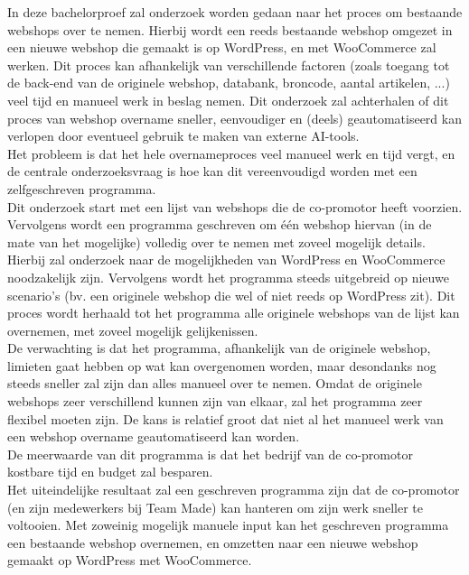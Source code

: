 \documentclass[dutch,dit,thesis]{hogentreport}
\begin{document}
In deze bachelorproef zal onderzoek worden gedaan naar het proces om bestaande webshops over te nemen. Hierbij wordt een reeds bestaande webshop omgezet in een nieuwe webshop die gemaakt is op WordPress, en met WooCommerce zal werken.
Dit proces kan afhankelijk van verschillende factoren (zoals toegang tot de back-end van de originele webshop, databank, broncode, aantal artikelen, ...) veel tijd en manueel werk in beslag nemen. Dit onderzoek zal achterhalen of dit proces van webshop overname sneller, eenvoudiger en (deels) geautomatiseerd kan verlopen door eventueel gebruik te maken van externe AI-tools.
\\
Het probleem is dat het hele overnameproces veel manueel werk en tijd vergt, en de centrale onderzoeksvraag is hoe kan dit vereenvoudigd worden met een zelfgeschreven programma.
\\ 
Dit onderzoek start met een lijst van webshops die de co-promotor heeft voorzien. 
Vervolgens wordt een programma geschreven om één webshop hiervan (in de mate van het mogelijke) volledig over te nemen met zoveel mogelijk details. Hierbij zal onderzoek naar de mogelijkheden van WordPress en WooCommerce noodzakelijk zijn.
Vervolgens wordt het programma steeds uitgebreid op nieuwe scenario's (bv. een originele webshop die wel of niet reeds op WordPress zit). Dit proces wordt herhaald tot het programma alle originele webshops van de lijst kan overnemen, met zoveel mogelijk gelijkenissen.
\\ 
De verwachting is dat het programma, afhankelijk van de originele webshop, limieten gaat hebben op wat kan overgenomen worden, maar desondanks nog steeds sneller zal zijn dan alles manueel over te nemen.
Omdat de originele webshops zeer verschillend kunnen zijn van elkaar, zal het programma zeer flexibel moeten zijn. De kans is relatief groot dat niet al het manueel werk van een webshop overname geautomatiseerd kan worden.
\\
De meerwaarde van dit programma is dat het bedrijf van de co-promotor kostbare tijd en budget zal besparen.
\\
Het uiteindelijke resultaat zal een geschreven programma zijn dat de co-promotor (en zijn medewerkers bij Team Made) kan hanteren om zijn werk sneller te voltooien. Met zoweinig mogelijk manuele input kan het geschreven programma een bestaande webshop overnemen, en omzetten naar een nieuwe webshop gemaakt op WordPress met WooCommerce.





\backmatter{}

\setlength\bibitemsep{2pt} %
\printbibliography[heading=bibintoc]
\end{document}
